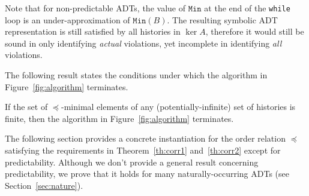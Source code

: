 \begin{remark}
Note that for non-predictable ADTs, the value of $\texttt{Min}$ at the end of the \texttt{while} loop 
is an under-approximation of $\texttt{Min}(B)$. 
The resulting symbolic ADT representation is still satisfied by all histories in $\ker A$, therefore it would still be sound in only identifying
\emph{actual} violations, yet incomplete in identifying \emph{all} violations.
\end{remark}

The following result states the conditions under which the algorithm in Figure~\ref{fig:algorithm} terminates.

\begin{theorem}\label{th:corr2}
If the set of $\preceq$-minimal elements of any (potentially-infinite) set of histories is finite, then the algorithm in Figure~\ref{fig:algorithm} terminates.
\end{theorem}

The following section provides a concrete instantiation for the order relation $\preceq$ satisfying the requirements in 
Theorem~\ref{th:corr1} and~\ref{th:corr2} except for predictability. 
Although we don't provide a general result concerning predictability, we prove that it holds for many naturally-occurring ADTs (see Section~\ref{sec:nature}).



